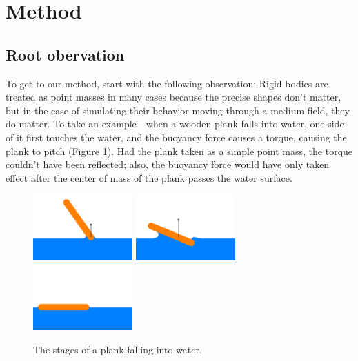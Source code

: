 \section{Method}

\subsection{Root obervation}

To get to our method, start with the following observation:
Rigid bodies are treated as point masses in many cases because the precise shapes don't matter, but in the case of simulating their behavior moving through a medium field, they do matter.
To take an example---when a wooden plank falls into water, one side of it first touches the water, and the buoyancy force causes a torque, causing the plank to pitch (Figure \ref{fig:plank-falling-into-water-illustration}).
Had the plank taken as a simple point mass, the torque couldn't have been reflected;
also, the buoyancy force would have only taken effect after the center of mass of the plank passes the water surface.

\begin{figure}[h]
	\def\ih{1in}
	\centering
	\includegraphics[height=\ih]{../Thesis/figures/stages-of-a-plank-falling-into-water/1.png}
	\includegraphics[height=\ih]{../Thesis/figures/stages-of-a-plank-falling-into-water/2.png}
	\includegraphics[height=\ih]{../Thesis/figures/stages-of-a-plank-falling-into-water/3.png}
	\caption{The stages of a plank falling into water.}
	\label{fig:plank-falling-into-water-illustration}
\end{figure}


